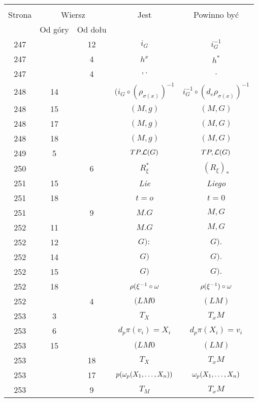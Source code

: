 \documentclass[a4paper,11pt]{article}
\begin{document}
\begin{center}
  \begin{tabular}{|c|c|c|c|c|}
    \hline
    & \multicolumn{2}{c|}{} & & \\
    Strona & \multicolumn{2}{c|}{Wiersz} & Jest
                              & Powinno być \\ \cline{2-3}
    & Od góry & Od dołu & & \\
    \hline
    247 & & 12 & $i_{ G }$ & $i_{ G }^{ -1 }$ \\
    247 & &  4 & $h^{ x }$ & $h^{ * }$ \\
    247 & &  4 & $, .$ & $.$ \\
    248 & 14 & & $( i_{ G } \circ ( \rho_{ \sigma( x ) } )^{ -1 }$
           & $i_{ G }^{ -1 } \circ ( d_{ e }\rho_{ \sigma( x ) } )^{ -1 }$ \\
    248 & 15 & & $( M, g )$ & $( M, G )$ \\
    248 & 17 & & $( M, g )$ & $( M, G )$ \\
    248 & 18 & & $( M, g )$ & $( M, G )$ \\
    249 &  5 & & $TP.\mathcal{L}(G)$ & $TP, \mathcal{L}(G)$ \\
    250 & &  6 & $R_{ \xi }^{ * }$ & $( R_{ \xi } )_{ * }$ \\
    251 & 15 & & \emph{Lie} & \emph{Liego} \\
    251 & 18 & & $t = o$ & $t = 0$ \\
    251 & &  9 & $M.G$ & $M, G$ \\
    252 & 11 & & $M.G$ & $M, G$ \\
    252 & 12 & & $G):$ & $G).$ \\
    252 & 14 & & $G)$ & $G).$ \\
    252 & 15 & & $G)$ & $G).$ \\
    252 & 18 & & $\rho( \xi^{ -1 } \circ \omega$
           & $\rho( \xi^{ -1 } ) \circ \omega$ \\
    252 & &  4 & $( LM 0$ & $( LM )$ \\
    253 &  3 & & $T_{ X }$ & $T_{ x }M$ \\
    253 &  6 & & $d_{ p } \pi( v_{ i } ) = X_ { i }$
           & $d_{ p } \pi( X_{ i }) = v_ { i }$ \\
    253 & 15 & & $( LM 0$ & $( LM )$ \\
    253 & & 18 & $T_{ X }$ & $T_{ x }M$ \\
    253 & & 17 & $p( \omega_{ p }( X_{ 1 }, \ldots, X_{ n } ) )$
           & $\omega_{ p }( X_{ 1 }, \ldots, X_{ n } )$ \\
    253 & &  9 & $T_{ M }$ & $T_{ x }M$ \\

\end{tabular}
\end{center}
\end{document}
